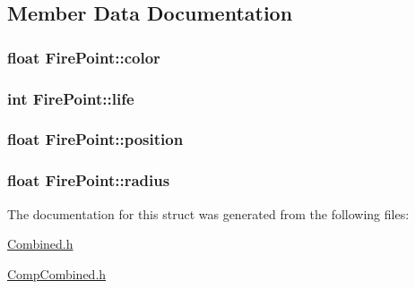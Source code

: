 \subsection{Member Data Documentation}
\hypertarget{structFirePoint_a0de87a3a5374fd7250e38300fd87a456}{
\subsubsection[{color}]{\setlength{\rightskip}{0pt plus 5cm}float Fire\-Point\-::color}}\label{structFirePoint_a0de87a3a5374fd7250e38300fd87a456}
\hypertarget{structFirePoint_a6736d7d7f3ee957076b3e5d7afbff8da}{
\subsubsection[{life}]{\setlength{\rightskip}{0pt plus 5cm}int Fire\-Point\-::life}}\label{structFirePoint_a6736d7d7f3ee957076b3e5d7afbff8da}
\hypertarget{structFirePoint_a141128f363dc8dde4c2b49b46b5d0482}{
\subsubsection[{position}]{\setlength{\rightskip}{0pt plus 5cm}float Fire\-Point\-::position}}\label{structFirePoint_a141128f363dc8dde4c2b49b46b5d0482}
\hypertarget{structFirePoint_a58564702fea12d591467ab0a61bec63e}{
\subsubsection[{radius}]{\setlength{\rightskip}{0pt plus 5cm}float Fire\-Point\-::radius}}\label{structFirePoint_a58564702fea12d591467ab0a61bec63e}


The documentation for this struct was generated from the following files\-:\begin{DoxyCompactItemize}
\item 
\hyperlink{Combined_8h}{Combined.\-h}\item 
\hyperlink{CompCombined_8h}{Comp\-Combined.\-h}\end{DoxyCompactItemize}
